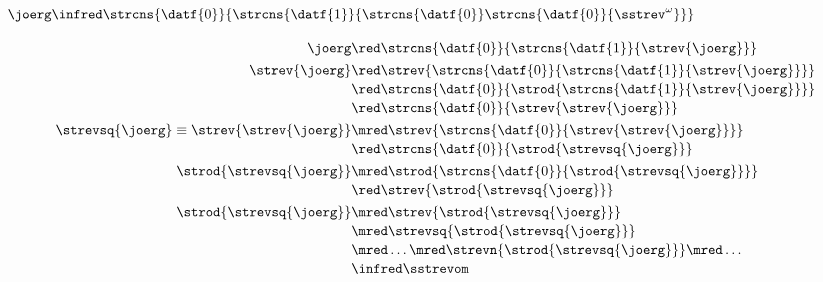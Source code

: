 \documentclass[10pt]{beamer}
\begin{document}
\begin{frame}%
  \frametitle{$\joerg %
                      \infred 
                       \strcns{\datf{0}}{\strcns{\datf{1}}{\strcns{\datf{0}}\strcns{\datf{0}}{
                                  \sstrev^{\omega}}}}$}
  \vspace*{-3.75ex}
  \begin{align*}
    \joerg  
      & \red 
        \strcns{\datf{0}}{\strcns{\datf{1}}{\strev{\joerg}}}  
                                                                  \\[0.2ex]
    \strev{\joerg} 
      & \red
        \strev{\strcns{\datf{0}}{\strcns{\datf{1}}{\strev{\joerg}}}}
                                                                    \\[-0.35ex]
      & \red
        \strcns{\datf{0}}{\strod{\strcns{\datf{1}}{\strev{\joerg}}}}
                                                                    \\[-0.35ex]
      & \red
        \strcns{\datf{0}}{\strev{\strev{\joerg}}} 
                                                                  \\[0.2ex]
    \strevsq{\joerg} \equiv
    \strev{\strev{\joerg}}
      & \mred 
        \strev{ \strcns{\datf{0}}{\strev{\strev{\joerg}}} }
                                                                    \\[-0.35ex]
      & \red
        \strcns{\datf{0}}{\strod{\strevsq{\joerg}}} 
                                                                  \\[0.2ex]
    \strod{\strevsq{\joerg}} 
      & \mred 
        \strod{\strcns{\datf{0}}{\strod{\strevsq{\joerg}}}}
                                                                    \\[-0.35ex]
      & \red
        \strev{\strod{\strevsq{\joerg}}} 
                                                                  \\[0.2ex]
    \strod{\strevsq{\joerg}}
      & \mred
        \strev{\strod{\strevsq{\joerg}}}
                                                                    \\[-0.35ex]
      & \mred
        \strevsq{\strod{\strevsq{\joerg}}}
                                                                    \\[-0.35ex]
      & \mred \ldots
        \mred \strevn{\strod{\strevsq{\joerg}}} 
        \mred \ldots
                                                                    \\[-0.35ex]
      & \infred 
        \sstrevom 
  \end{align*}


\end{frame}
\end{document}
